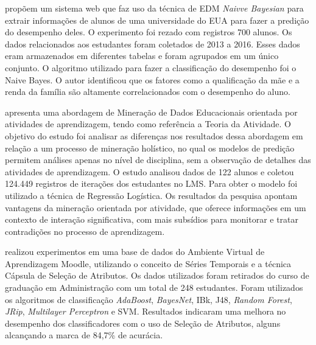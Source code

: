 \documentclass[ti]{texufpel} %
\begin{document}
\citet{devasia2016prediction} propõem um sistema web que faz uso da técnica de EDM \textit{Naivve Bayesian} para extrair informações de alunos de uma universidade do EUA para fazer a predição do desempenho deles. O experimento foi rezado com registros 700 alunos. Os dados relacionados aos estudantes foram coletados de 2013 a 2016. Esses dados eram armazenados em diferentes tabelas e foram agrupados em um único conjunto. O algoritmo utilizado para fazer a classificação do desempenho foi o Naive Bayes. O autor identificou que os fatores como a qualificação da mãe e a renda da família são altamente correlacionados com o desempenho do aluno.

\citet{silva2016mineraccao} apresenta uma abordagem de Mineração de Dados Educacionais orientada por atividades de aprendizagem, tendo como referência a Teoria da Atividade. O objetivo do estudo foi analisar as diferenças nos resultados dessa abordagem em relação a um processo de mineração holístico, no qual os modelos de predição permitem análises apenas no nível de disciplina, sem a observação de detalhes das atividades de aprendizagem. O estudo analisou dados de 122 alunos e coletou 124.449 registros de iterações dos estudantes no LMS. Para obter o modelo foi utilizado a técnica de Regressão Logística. Os resultados da pesquisa apontam vantagens da mineração orientada por atividade, que oferece informações em um contexto de interação significativa, com mais subsídios para monitorar e tratar contradições no processo de aprendizagem.

\citet{santos2016uso}  realizou experimentos em uma base de dados do Ambiente Virtual de Aprendizagem Moodle, utilizando o conceito de Séries Temporais e a técnica Cápsula de Seleção de Atributos. Os dados utilizados foram retirados do curso de graduação em Administração com um total de 248 estudantes. Foram utilizados os algoritmos de classificação \textit{AdaBoost}, \textit{BayesNet}, IBk, J48, \textit{Random Forest}, \textit{JRip}, \textit{Multilayer Perceptron} e SVM. Resultados indicaram uma melhora no desempenho dos classificadores com o uso de Seleção de Atributos, alguns alcançando a marca de 84,7\% de acurácia.
\end{document}
